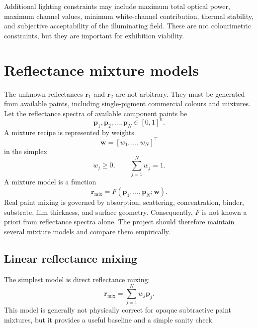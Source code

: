 \documentclass[11pt,a4paper]{article}
\newcommand{\vect}[1]{\boldsymbol{#1}}
\begin{document}
Additional lighting constraints may include maximum total optical power, maximum channel values, minimum white-channel contribution, thermal stability, and subjective acceptability of the illuminating field. These are not colourimetric constraints, but they are important for exhibition viability.

\section{Reflectance mixture models}

The unknown reflectances $\vect{r}_1$ and $\vect{r}_2$ are not arbitrary. They must be generated from available paints, including single-pigment commercial colours and mixtures. Let the reflectance spectra of available component paints be
\begin{equation}
 \vect{p}_1,\vect{p}_2,\ldots,\vect{p}_N\in[0,1]^n.
\end{equation}
A mixture recipe is represented by weights
\begin{equation}
 \vect{w}=[w_1,\ldots,w_N]^\top
\end{equation}
in the simplex
\begin{equation}
 w_j\ge0,\qquad \sum_{j=1}^{N}w_j=1.
 \label{eq:paint_simplex}
\end{equation}
A mixture model is a function
\begin{equation}
 \vect{r}_{\mathrm{mix}}=F(\vect{p}_1,\ldots,\vect{p}_N;\vect{w}).
 \label{eq:mixture_function}
\end{equation}
Real paint mixing is governed by absorption, scattering, concentration, binder, substrate, film thickness, and surface geometry. Consequently, $F$ is not known a priori from reflectance spectra alone. The project should therefore maintain several mixture models and compare them empirically.

\subsection{Linear reflectance mixing}

The simplest model is direct reflectance mixing:
\begin{equation}
 \vect{r}_{\mathrm{mix}}=\sum_{j=1}^{N}w_j\vect{p}_j.
 \label{eq:linear_reflectance_mixing}
\end{equation}
This model is generally not physically correct for opaque subtractive paint mixtures, but it provides a useful baseline and a simple sanity check.
\end{document}
